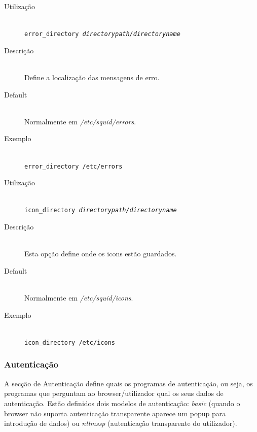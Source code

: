 
\begin{description}
\item[Utilização]~\\
\texttt{error\_directory \emph{directorypath/directoryname}}

\item[Descrição]~\\
Define a localização das mensagens de erro.

\item[Default]~\\
Normalmente em \emph{/etc/squid/errors}.

\item[Exemplo]~\\
\texttt{error\_directory /etc/errors}
\end{description}


\begin{description}
\item[Utilização]~\\
\texttt{icon\_directory \emph{directorypath/directoryname}}

\item[Descrição]~\\
Esta opção define onde os icons estão guardados.

\item[Default]~\\
Normalmente em \emph{/etc/squid/icons}.

\item[Exemplo]~\\
\texttt{icon\_directory /etc/icons}
\end{description}

\subsubsection{Autenticação}

A secção de Autenticação define quais os programas de
autenticação, ou seja, os programas que perguntam ao
browser/utilizador qual os seus dados de autenticação.
Estão definidos dois modelos de autenticação: \emph{basic}
(quando o browser não suporta autenticação transparente
aparece um popup para introdução de dados) ou \emph{ntlmssp}
(autenticação transparente do utilizador).


